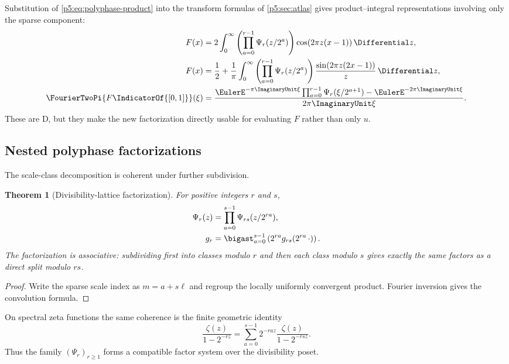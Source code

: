 \documentclass[11pt]{article}
\newtheorem{theorem}{Theorem}[section]
\theoremstyle{definition}
\theoremstyle{remark}
\newcommand{\statusderived}{\textsf{D}}
\begin{document}
Substitution of \eqref{p5:eq:polyphase-product} into the transform formulas of
\cref{p5:sec:atlas} gives product--integral representations involving only the
sparse component:
\begin{align}
 F(x)
 &=2\int_0^\infty
   \left(\prod_{a=0}^{r-1}\Psi_r(z/2^a)\right)
   \cos(2\pi z(x-1))\,\Differential z,                              \label{p5:eq:F-polyphase-cosine-integral}\\
 F(x)
 &=\frac12+\frac1\pi\int_0^\infty
   \left(\prod_{a=0}^{r-1}\Psi_r(z/2^a)\right)
   \frac{\sin(2\pi z(2x-1))}{z}\,\Differential z,                 \label{p5:eq:F-polyphase-CDF-integral}\\
 \FourierTwoPi{F\IndicatorOf{[0,1]}}(\xi)
 &=\frac{\EulerE^{-\pi\ImaginaryUnit\xi}
   \prod_{a=0}^{r-1}\Psi_r(\xi/2^{a+1})-
   \EulerE^{-2\pi\ImaginaryUnit\xi}}{2\pi\ImaginaryUnit\xi}.                   \label{p5:eq:F-polyphase-Fourier}
\end{align}
These are \statusderived, but they make the new factorization directly usable
for evaluating $F$ rather than only $u$.

\subsection{Nested polyphase factorizations}

The scale-class decomposition is coherent under further subdivision.

\begin{theorem}[Divisibility-lattice factorization]
\label{p5:thm:nested-polyphase}
For positive integers $r$ and $s$,
\begin{align}
 \Psi_r(z)
 &=\prod_{a=0}^{s-1}\Psi_{rs}(z/2^{ra}),                  \label{p5:eq:nested-Psi}\\
 g_r
 &=\bigast_{a=0}^{s-1}\left(2^{ra}g_{rs}(2^{ra}\,\cdot)\right). \label{p5:eq:nested-gr}
\end{align}
The factorization is associative: subdividing first into classes modulo $r$
and then each class modulo $s$ gives exactly the same factors as a direct split
modulo $rs$.
\end{theorem}

\begin{proof}
Write the sparse scale index as $m=a+s\ell$ and regroup the locally uniformly
convergent product.  Fourier inversion gives the convolution formula.
\end{proof}

On spectral zeta functions the same coherence is the finite geometric identity
\begin{equation}
 \frac{\zeta(z)}{1-2^{-rz}}
 =\sum_{a=0}^{s-1}2^{-raz}\frac{\zeta(z)}{1-2^{-rsz}}.     \label{p5:eq:nested-zeta}
\end{equation}
Thus the family $(\Psi_r)_{r\ge1}$ forms a compatible factor system over the
divisibility poset.
\end{document}
